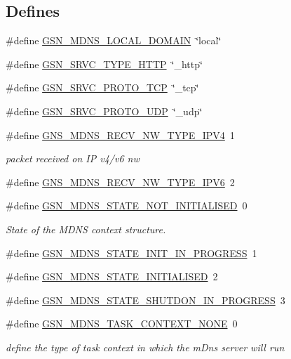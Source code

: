 \subsection*{Defines}
\begin{DoxyCompactItemize}
\item 
\#define \hyperlink{a00526_abe4dc1c9abd2115cf4654dcf310bee86}{GSN\_\-MDNS\_\-LOCAL\_\-DOMAIN}~\char`\"{}local\char`\"{}
\item 
\#define \hyperlink{a00526_a57741fb286c26a34de7daf93a2e278ad}{GSN\_\-SRVC\_\-TYPE\_\-HTTP}~\char`\"{}\_\-http\char`\"{}
\item 
\#define \hyperlink{a00526_aca9d27f09492bb603d2c868b5214913f}{GSN\_\-SRVC\_\-PROTO\_\-TCP}~\char`\"{}\_\-tcp\char`\"{}
\item 
\#define \hyperlink{a00526_a2da369ee106c23e9706a188b2c0861eb}{GSN\_\-SRVC\_\-PROTO\_\-UDP}~\char`\"{}\_\-udp\char`\"{}
\item 
\#define \hyperlink{a00668_gae805e6fbb7579781605600a78cbe0959}{GNS\_\-MDNS\_\-RECV\_\-NW\_\-TYPE\_\-IPV4}~1
\begin{DoxyCompactList}\small\item\em packet received on IP v4/v6 nw \end{DoxyCompactList}\item 
\#define \hyperlink{a00526_ad1c790e56e227669ebea710774f898da}{GNS\_\-MDNS\_\-RECV\_\-NW\_\-TYPE\_\-IPV6}~2
\item 
\#define \hyperlink{a00668_ga0b9291043d21e03b1202e152d19abcb8}{GSN\_\-MDNS\_\-STATE\_\-NOT\_\-INITIALISED}~0
\begin{DoxyCompactList}\small\item\em State of the MDNS context structure. \end{DoxyCompactList}\item 
\#define \hyperlink{a00526_a0d474ae74253a37caa617a1f86c6a643}{GSN\_\-MDNS\_\-STATE\_\-INIT\_\-IN\_\-PROGRESS}~1
\item 
\#define \hyperlink{a00526_a07057e9e1fc1daab33f89e582e42f436}{GSN\_\-MDNS\_\-STATE\_\-INITIALISED}~2
\item 
\#define \hyperlink{a00526_a48c72de96f3fb52e3b3f0b1f8dfd9742}{GSN\_\-MDNS\_\-STATE\_\-SHUTDON\_\-IN\_\-PROGRESS}~3
\item 
\#define \hyperlink{a00668_ga56106404858e7c3f99fa52890f684d53}{GSN\_\-MDNS\_\-TASK\_\-CONTEXT\_\-NONE}~0
\begin{DoxyCompactList}\small\item\em define the type of task context in which the mDns server will run \end{DoxyCompactList}\item 

\end{DoxyCompactItemize}
